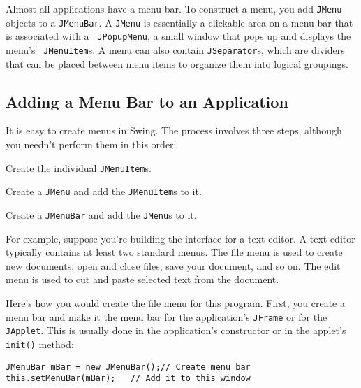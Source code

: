 \begin{figure}[h!]
\end{figure}

Almost all applications have a menu bar. To construct a menu, you add
{\tt JMenu} objects to a {\tt JMenuBar}. A {\tt JMenu} is essentially
a clickable area on a menu bar that is associated with a {\tt
JPopupMenu}, a small window that pops up and displays the menu's {\tt
JMenuItem}s.  A menu can also contain {\tt JSeparator}s, which are
dividers that can be placed between menu items to organize them into
logical groupings.

\subsection{Adding a Menu Bar to an Application}
\noindent It is easy to create menus in Swing. The process involves three steps,
although you needn't perform them in this order:

\begin{NL}
\item  Create the individual {\tt JMenuItem}s.
\item  Create a {\tt JMenu} and add the {\tt JMenuItem}s to it.
\item  Create a {\tt JMenuBar} and add the {\tt JMenu}s to it.
\end{NL}

For example, suppose you're building the interface for a text
editor. A text editor typically contains at least two standard
menus. The file menu is used to create new documents, open and close
files, save your document, and so on.  The edit menu is used to cut
and paste selected text from the document. 

Here's how you would create the file menu for this program. First, you
create a menu bar and make it the menu bar for the application's
{\tt JFrame} or for the {\tt JApplet}. This is usually done in the
application's constructor or in the applet's {\tt init()} method:

\begin{jjjlisting}
\begin{lstlisting}
JMenuBar mBar = new JMenuBar();// Create menu bar
this.setMenuBar(mBar);   // Add it to this window
\end{lstlisting}
\end{jjjlisting}


